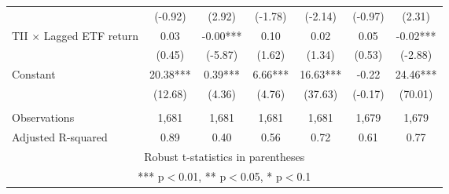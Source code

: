 \documentclass[]{article}
\begin{document}
\begin{tabular}{lcccccc}
 & (-0.92) & (2.92) & (-1.78) & (-2.14) & (-0.97) & (2.31) \\
TII $\times$ Lagged ETF return & 0.03 & -0.00*** & 0.10 & 0.02 & 0.05 & -0.02*** \\
 & (0.45) & (-5.87) & (1.62) & (1.34) & (0.53) & (-2.88) \\
Constant & 20.38*** & 0.39*** & 6.66*** & 16.63*** & -0.22 & 24.46*** \\
 & (12.68) & (4.36) & (4.76) & (37.63) & (-0.17) & (70.01) \\
 &  &  &  &  &  &  \\
Observations & 1,681 & 1,681 & 1,681 & 1,681 & 1,679 & 1,679 \\
 Adjusted R-squared & 0.89 & 0.40 & 0.56 & 0.72 & 0.61 & 0.77 \\ \hline
\multicolumn{7}{c}{ Robust t-statistics in parentheses} \\
\multicolumn{7}{c}{ *** p$<$0.01, ** p$<$0.05, * p$<$0.1} \\
\end{tabular}
\end{document}
